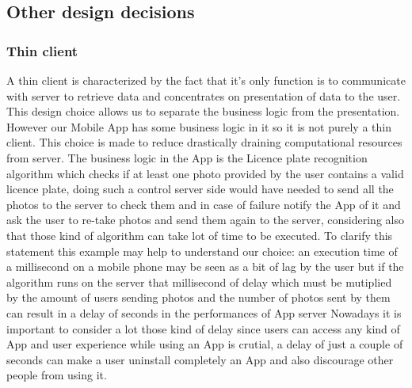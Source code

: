 \subsection{Other design decisions}
\subsubsection{Thin client }
A thin client is characterized by the fact that it's only function is to communicate with server to retrieve data and concentrates on presentation of data to the user.
\newline
This design choice allows us to separate the business logic from the presentation. However our Mobile App has some business logic in it so it is not purely a thin client. This choice is made to reduce drastically draining computational resources from server. The business logic in the App is the Licence plate recognition algorithm which checks if at least one photo provided by the user contains a valid licence plate, doing such a control server side would have needed to send all the photos to the server to check them and in case of failure notify the App of it and ask the user to re-take photos and send them again to the server, considering also that those kind of algorithm can take lot of time to be executed.
To clarify this statement this example may help to understand our choice: an execution time of a millisecond on a mobile phone may be seen as a bit of lag by the user but if the algorithm runs on the server that millisecond of delay which must be mutiplied by the amount of users sending photos and the number of photos sent by them can result in a delay of seconds in the performances of App server
Nowadays it is important to consider a lot those kind of delay since users can access any kind of App and user experience while using an App is crutial, a delay of just a couple of seconds can make a user uninstall completely an App and also discourage other people from using it.










